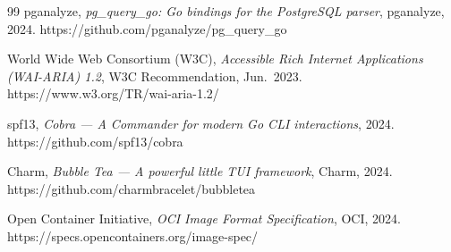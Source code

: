 \documentclass[12pt,a4paper]{report}
\begin{document}
\begin{thebibliography}{99}
pganalyze, \textit{pg\_query\_go: Go bindings for the PostgreSQL parser}, pganalyze, 2024. https://github.com/pganalyze/pg\_query\_go

World Wide Web Consortium (W3C), \textit{Accessible Rich Internet Applications (WAI-ARIA) 1.2}, W3C Recommendation, Jun.\ 2023. https://www.w3.org/TR/wai-aria-1.2/

spf13, \textit{Cobra --- A Commander for modern Go CLI interactions}, 2024. https://github.com/spf13/cobra

Charm, \textit{Bubble Tea --- A powerful little TUI framework}, Charm, 2024. https://github.com/charmbracelet/bubbletea

Open Container Initiative, \textit{OCI Image Format Specification}, OCI, 2024. https://specs.opencontainers.org/image-spec/

\end{thebibliography}


\end{document}
